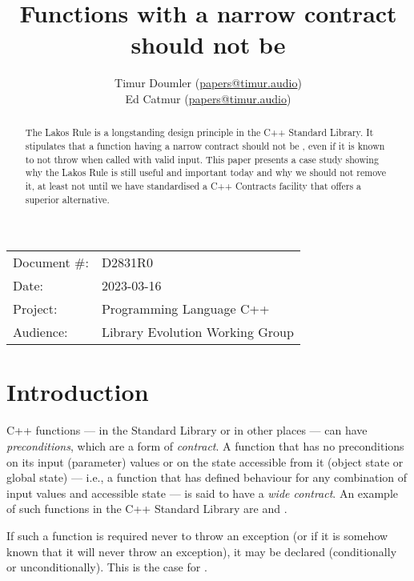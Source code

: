 


\title{Functions with a narrow contract should not be }
\author{ Timur Doumler \small(\href{mailto:papers@timur.audio}{papers@timur.audio})   \\
Ed Catmur \small(\href{mailto:papers@timur.audio}{papers@timur.audio})  }
\date{}
\maketitle

\begin{tabular}{ll}
Document \#: & D2831R0 \\
Date: &2023-03-16 \\
Project: & Programming Language C++ \\
Audience: & Library Evolution Working Group
\end{tabular}

\begin{abstract}
The Lakos Rule is a longstanding design principle in the C++ Standard Library. It stipulates that a function having a narrow contract should not be , even if it is known to not throw when called with valid input. This paper presents a case study showing why the Lakos Rule is still useful and important today and why we should not remove it, at least not until we have standardised a C++ Contracts facility that offers a superior alternative.
\end{abstract}

\section{Introduction}
\label{sec:intro}

C++ functions --- in the Standard Library or in other places --- can have \emph{preconditions}, which are a form of \emph{contract}. A function that has no preconditions on its input (parameter) values or on the state accessible from it (object state or global state) --- i.e., a function that has defined behaviour for any combination of input values and accessible state --- is said to have a \emph{wide contract}. An example of such functions in the C++ Standard Library are  and .

If such a function is required never to throw an exception (or if it is somehow known that it will never throw an exception), it may be declared  (conditionally or unconditionally). This is the case for .

